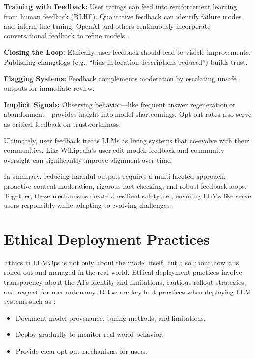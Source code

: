 \textbf{Training with Feedback:} User ratings can feed into reinforcement learning from human feedback (RLHF). Qualitative feedback can identify failure modes and inform fine-tuning. OpenAI and others continuously incorporate conversational feedback to refine models \cite{altexsoft2023}.

\textbf{Closing the Loop:} Ethically, user feedback should lead to visible improvements. Publishing changelogs (e.g., ``bias in location descriptions reduced'') builds trust.

\textbf{Flagging Systems:} Feedback complements moderation by escalating unsafe outputs for immediate review.

\textbf{Implicit Signals:} Observing behavior---like frequent answer regeneration or abandonment---provides insight into model shortcomings. Opt-out rates also serve as critical feedback on trustworthiness.

Ultimately, user feedback treats LLMs as living systems that co-evolve with their communities. Like Wikipedia's user-edit model, feedback and community oversight can significantly improve alignment over time.

\bigskip
In summary, reducing harmful outputs requires a multi-faceted approach: proactive content moderation, rigorous fact-checking, and robust feedback loops. Together, these mechanisms create a resilient safety net, ensuring LLMs like \ishtar{} serve users responsibly while adapting to evolving challenges.

\section{Ethical Deployment Practices}\label{sec:ethics-deploy}

Ethics in LLMOps is not only about the model itself, but also about how it is rolled out and managed in the real world. Ethical deployment practices involve transparency about the AI's identity and limitations, cautious rollout strategies, and respect for user autonomy. Below are key best practices when deploying LLM systems such as \ishtar{}:

\begin{itemize}
    \item Document model provenance, tuning methods, and limitations.
    \item Deploy gradually to monitor real-world behavior.
    \item Provide clear opt-out mechanisms for users.
\end{itemize}

